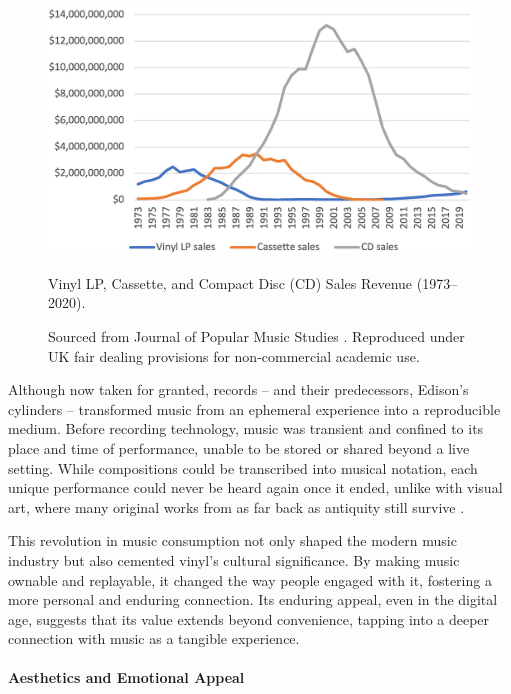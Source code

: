             \begin{figure}[htbp]
                \centering
                \includegraphics[width=\linewidth]{images/vinyl_sales_2023.png}
                \caption{Vinyl LP, Cassette, and Compact Disc (CD) Sales Revenue (1973–2020).}
                \caption*{Sourced from Journal of Popular Music Studies \cite{vinylRevival}. Reproduced under UK fair dealing provisions for non-commercial academic use.}
                \label{fig:vinyl_sales}
            \end{figure}
    
            Although now taken for granted, records -- and their predecessors, Edison's cylinders -- transformed music from an ephemeral experience into a reproducible medium. Before recording technology, music was transient and confined to its place and time of performance, unable to be stored or shared beyond a live setting. While compositions could be transcribed into musical notation, each unique performance could never be heard again once it ended, unlike with visual art, where many original works from as far back as antiquity still survive \cite{jdbond}.
    
            This revolution in music consumption not only shaped the modern music industry but also cemented vinyl's cultural significance. By making music ownable and replayable, it changed the way people engaged with it, fostering a more personal and enduring connection. Its enduring appeal, even in the digital age, suggests that its value extends beyond convenience, tapping into a deeper connection with music as a tangible experience.
    
            \paragraph{Aesthetics and Emotional Appeal}
    
